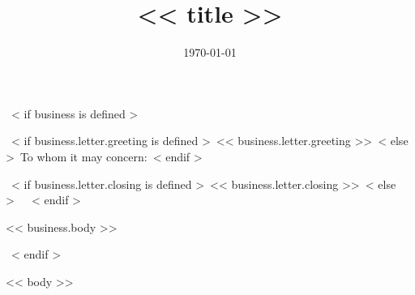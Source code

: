 \documentclass[<< theme.font_size >>, << theme.paper_size >>]{moderncv}
\title{<< title >>}
\begin{document}
~< if business is defined >~
\date{\today}
\opening{~< if business.letter.greeting is defined >~<< business.letter.greeting >>~< else >~To whom it may concern:~< endif >~}
\closing{~< if business.letter.closing is defined >~<< business.letter.closing >>~< else >~{\ }~< endif >~}

\makelettertitle            %
<< business.body >>

\makeletterclosing          %
\newpage
\setcounter{page}{1}
~< endif >~


\makecvtitle
\vspace{-20pt}

<< body >>
\end{document}
